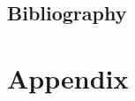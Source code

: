 \fancyhf{}
\renewcommand{\headrulewidth}{0.4pt}


\doubleOrSinglePaged


\begin{flushleft}
		\section{Bibliography}
	\renewcommand{\headrulewidth}{0.4pt}
	{\def\section*#1{}\printbibliography}
	
\end{flushleft}
\newpage




{\def\section*#1{}\listoffigures}
\pagebreak



{\def\section*#1{}\listoftables}
\pagebreak

\section{Appendix}

\newpage
